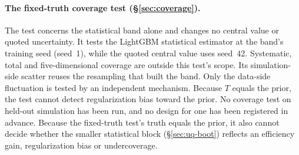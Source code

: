 \paragraph{The fixed-truth coverage test (\S\ref{sec:coverage}).} The test concerns the statistical band alone and changes no central value or quoted uncertainty. It tests the LightGBM statistical estimator at the band's training seed (seed~1), while the quoted central value uses seed~42. Systematic, total and five-dimensional coverage are outside this test's scope. Its simulation-side scatter reuses the resampling that built the band. Only the data-side fluctuation is tested by an independent mechanism. Because $T$ equals the prior, the test cannot detect regularization bias toward the prior. No coverage test on held-out simulation has been run, and no design for one has been registered in advance. Because the fixed-truth test's truth equals the prior, it also cannot decide whether the smaller statistical block (\S\ref{sec:uq-boot}) reflects an efficiency gain, regularization bias or undercoverage.

